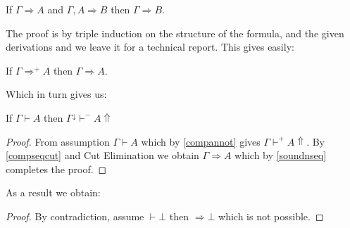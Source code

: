 						\begin{theorem}
							If $\Gamma\Rightarrow A$ and $\Gamma,A\Rightarrow B$ then $\Gamma\Rightarrow B$.
						\end{theorem}
						The proof is by triple induction on the structure of the formula, and the given derivations and we leave it for a technical report. This gives easily:
						\begin{theorem}
							If $\Gamma\Rightarrow^{+}A$ then $\Gamma\Rightarrow A$.
							
						\end{theorem}
						Which in turn gives us:
						\begin{theorem}
							\label{normalization}
							If $\Gamma\vdash A$ then $\Gamma^{\downarrow}\vdash^{-} A\Uparrow$
						\end{theorem}
						\begin{proof}
							From assumption $\Gamma \vdash A$ which by \ref{compannot} gives $\Gamma\vdash^{+} A\Uparrow$. By \ref{compseqcut} and Cut  Elimination we obtain $\Gamma\Rightarrow A$ which by  \ref{soundnseq} completes the proof.
						\end{proof}
						As a result we obtain:

						\begin{proof}
							By contradiction, assume $\vdash\bot$ then $\Rightarrow \bot$ which is not possible.
						\end{proof}
